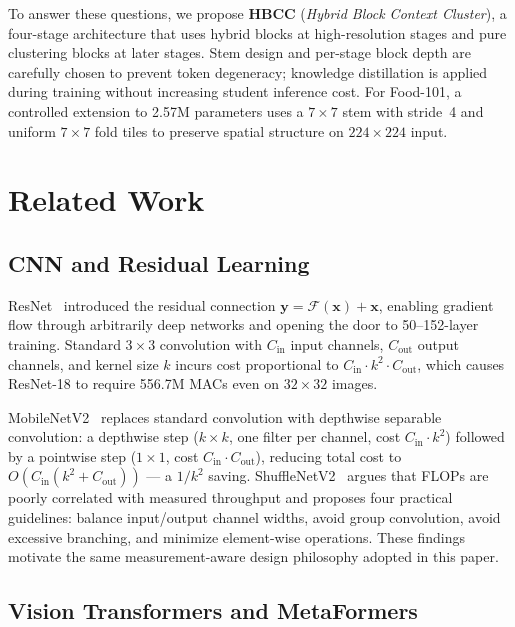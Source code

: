\documentclass[conference]{IEEEtran}
\begin{document}
To answer these questions, we propose \textbf{HBCC}
(\textit{Hybrid Block Context Cluster}), a four-stage architecture
that uses hybrid blocks at high-resolution stages and pure clustering
blocks at later stages. Stem design and per-stage block depth are
carefully chosen to prevent token degeneracy; knowledge distillation
is applied during training without increasing student inference cost.
For Food-101, a controlled extension to 2.57M parameters uses a
$7\!\times\!7$ stem with stride~4 and uniform $7\!\times\!7$ fold
tiles to preserve spatial structure on $224\!\times\!224$ input.

\section{Related Work}
\label{sec:related}

\subsection{CNN and Residual Learning}

ResNet~\cite{He2016ResNet} introduced the residual connection
$\mathbf{y}=\mathcal{F}(\mathbf{x})+\mathbf{x}$, enabling gradient
flow through arbitrarily deep networks and opening the door to
50--152-layer training. Standard $3\!\times\!3$ convolution with
$C_{\mathrm{in}}$ input channels, $C_{\mathrm{out}}$ output channels,
and kernel size $k$ incurs cost proportional to
$C_{\mathrm{in}}\!\cdot\!k^2\!\cdot\!C_{\mathrm{out}}$, which causes
ResNet-18 to require 556.7M MACs even on $32\!\times\!32$ images.

MobileNetV2~\cite{Sandler2018MobileNetV2} replaces standard
convolution with depthwise separable convolution: a depthwise step
($k\!\times\!k$, one filter per channel, cost $C_{\mathrm{in}}\!\cdot\!k^2$)
followed by a pointwise step ($1\!\times\!1$, cost
$C_{\mathrm{in}}\!\cdot\!C_{\mathrm{out}}$), reducing total cost to
$O(C_{\mathrm{in}}(k^2+C_{\mathrm{out}}))$ --- a $1/k^2$ saving.
ShuffleNetV2~\cite{Ma2018ShuffleNetV2} argues that FLOPs are poorly
correlated with measured throughput and proposes four practical
guidelines: balance input/output channel widths, avoid group
convolution, avoid excessive branching, and minimize element-wise
operations. These findings motivate the same measurement-aware design
philosophy adopted in this paper.

\subsection{Vision Transformers and MetaFormers}
\end{document}
